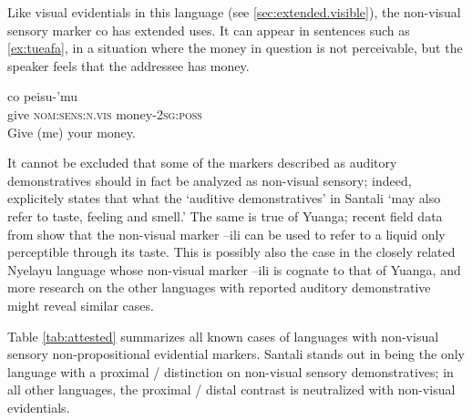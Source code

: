\documentclass[oneside,a4paper,11pt]{article}
\newcommand{\ipa}[1]{{\phon \mbox{#1}}} %
\begin{document}
Like visual evidentials in this language (see \ref{sec:extended.visible}), the non-visual sensory marker \ipa{co} has extended uses. It can appear in sentences such as \ref{ex:tueafa}, in a situation where the money in question is not perceivable, but the speaker feels that the addressee has money.

\begin{exe}
\ex  \label{ex:tueafa}
\gll \ipa{tueafa}   \ipa{co} \ipa{peisu-'mu} \\
give \textsc{nom:sens:n.vis} money-\textsc{2sg:poss} \\
\glt Give (me) your money.
\end{exe}

It cannot be excluded that some of the markers described as auditory demonstratives should in fact be analyzed as non-visual sensory; indeed, \citet[42]{neukom01santali} explicitely states that what the `auditive demonstratives' in Santali `may also refer to taste, feeling and smell.' The same is true of Yuanga; recent field data from \citet{bril-yuanga} show that the non-visual marker  \ipa{--ili} can be used to refer to a liquid only perceptible through its taste. This is possibly also the case in the closely related Nyelayu language whose non-visual marker  \ipa{--ili} is cognate to that of Yuanga, and more research on the other languages with reported auditory demonstrative might reveal similar cases.

Table \ref{tab:attested} summarizes all known cases of languages with non-visual sensory non-propositional evidential markers.  Santali stands out in being the only language with a proximal / distinction on non-visual sensory demonstratives; in all other languages, the proximal / distal contrast is neutralized with non-visual evidentials. 

\begin{table}[H]
\caption{Non-propositional evidential systems with non-visual sensory evidentials } \label{tab:attested}
\end{table}	
 
\end{document}
